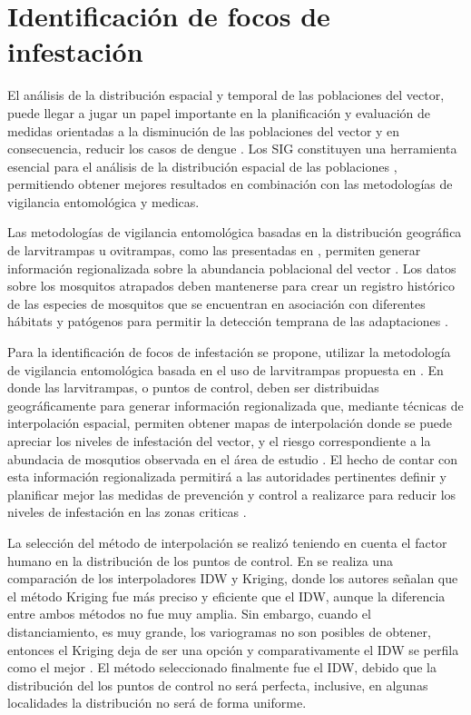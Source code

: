\section{Identificación de focos de infestación}
\label{sec:cap4-identificacion-focos}

El análisis de la distribución espacial y temporal de las poblaciones del vector, puede llegar a
jugar un papel importante en la planificación y evaluación de medidas orientadas a la disminución
de las poblaciones del vector y en consecuencia, reducir los casos de dengue
\cite{dengueUruguayCap1, cenaprece2013,nino2008uso}. Los SIG constituyen una herramienta esencial
para el análisis de la distribución espacial de las poblaciones
\cite{vgomesAegis2001,petric2012surveillance}, permitiendo obtener mejores resultados en
combinación con las metodologías de vigilancia entomológica y medicas\cite{petric2012surveillance}.

Las metodologías de vigilancia entomológica basadas en la distribución geográfica de larvitrampas
u ovitrampas, como las presentadas en
\cite{NINO2011,petric2012surveillance, journal.pone.0054167,nino2008uso}, permiten generar
información regionalizada sobre la abundancia poblacional del vector \cite{NINO2011}. Los datos
sobre los mosquitos atrapados deben mantenerse para crear un registro histórico de las especies de
mosquitos que se encuentran en asociación con diferentes hábitats y patógenos para permitir la
detección temprana de las adaptaciones \cite{petric2012surveillance}.

Para la identificación de focos de infestación se propone, utilizar la metodología de vigilancia
entomológica basada en el uso de larvitrampas propuesta en \cite{NINO2011}. En donde las
larvitrampas, o puntos de control, deben ser distribuidas geográficamente para generar información
regionalizada que, mediante técnicas de interpolación espacial, permiten obtener mapas de
interpolación donde se puede apreciar los niveles de infestación del vector, y el riesgo
correspondiente a la abundacia de mosqutios observada en el área de estudio \cite{NINO2011, nino2008uso, journal.pone.0054167, albierispatial}. El hecho de contar con esta información
regionalizada permitirá a las autoridades pertinentes definir y planificar mejor las medidas de
prevención y control a realizarce para reducir los niveles de infestación en las zonas criticas
\cite{NINO2011, nino2008uso, petric2012surveillance}.

La selección del método de interpolación se realizó teniendo en cuenta el factor humano en la
distribución de los puntos de control. En \cite{villatoro2007comparacion} se realiza una
comparación de los interpoladores IDW y Kriging, donde los autores señalan que el método Kriging
fue más preciso y eficiente que el IDW, aunque la diferencia entre ambos métodos no fue muy amplia.
Sin embargo, cuando el distanciamiento, es muy grande, los variogramas no son posibles de obtener,
entonces el Kriging deja de ser una opción y comparativamente el IDW se perfila como el mejor
\cite{villatoro2007comparacion}. El método seleccionado finalmente fue el IDW, debido que la
distribución del los puntos de control no será perfecta, inclusive, en algunas localidades la
distribución no será de forma uniforme.

